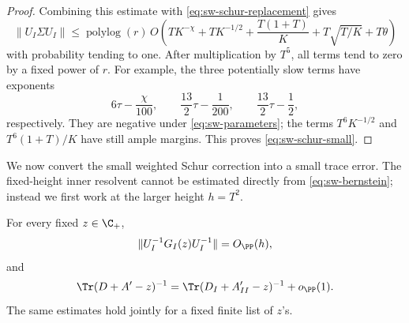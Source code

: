 \begin{proof}
Combining this estimate with \eqref{eq:sw-schur-replacement} gives
\[
 \|U_I\Sigma U_I\|
 \le \operatorname{polylog}(r)\,O\left(
 TK^{-\chi}+TK^{-1/2}+\frac{T(1+T)}K
       +T\sqrt{T/K}+T\theta\right)
\]
with probability tending to one. After multiplication by \(T^5\), all
terms tend to zero by a fixed power of \(r\). For example, the three
potentially slow terms have exponents
\[
 6\tau-\frac{\chi}{100},\qquad
 \frac{13}{2}\tau-\frac1{200},\qquad
 \frac{13}{2}\tau-\frac12,
\]
respectively. They are negative under \eqref{eq:sw-parameters}; the terms
\(T^6K^{-1/2}\) and \(T^6(1+T)/K\) have still ample margins.
This proves \eqref{eq:sw-schur-small}.
\end{proof}

We now convert the small weighted Schur correction into a small trace
error. The fixed-height inner resolvent cannot be estimated directly from
\eqref{eq:sw-bernstein}; instead we first work at the larger height \(h=T^2\).

\begin{lemma}\label{sw:trace-cut}
For every fixed \(z\in\C_+\),
\begin{equation}\label{eq:sw-inner-resolvent}
 \|U_I^{-1}G_I(z)U_I^{-1}\|=O_{\PP}(h),
\end{equation}
and
\begin{equation}\label{eq:sw-second-cut}
 \Tr(D+A'-z)^{-1}
 =\Tr(D_I+A'_{II}-z)^{-1}+o_{\PP}(1).
\end{equation}
The same estimates hold jointly for a fixed finite list of \(z\)'s.
\end{lemma}

